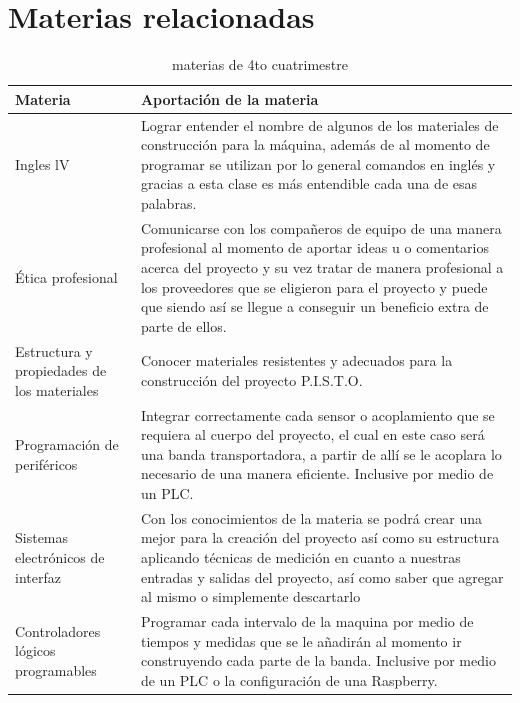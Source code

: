 \documentclass[12pt,a4paper]{article}
\begin{document}
\section{Materias relacionadas}
\begin{table}[H]
\centering
\begin{tabular}{|m{4cm}|m{11cm}|}

\hline
Materia & Aportación de la materia \\
\hline
Ingles lV &  Lograr entender el nombre de algunos de los materiales de construcción para la máquina, además de al momento de programar se utilizan por lo general comandos en inglés y gracias a esta clase es más entendible cada una de esas palabras.\\
\hline
Ética profesional & Comunicarse con los compañeros de equipo de una manera profesional al momento de aportar ideas u o comentarios acerca del proyecto y su vez tratar de manera profesional a los proveedores que se eligieron para el proyecto y puede que siendo así se llegue a conseguir un beneficio extra de parte de ellos.\\
\hline
Estructura y propiedades de los materiales & Conocer materiales resistentes y adecuados para la construcción del proyecto P.I.S.T.O. \\
\hline
Programación de periféricos & Integrar correctamente cada sensor o acoplamiento que se requiera al cuerpo del proyecto, el cual en este caso será una banda transportadora, a partir de allí se le acoplara lo necesario de una manera eficiente. Inclusive por medio de un PLC. \\
\hline
Sistemas electrónicos de interfaz & Con los conocimientos de la materia se podrá crear una mejor para la creación del proyecto así como su estructura aplicando técnicas de medición en cuanto a nuestras entradas y salidas del proyecto, así como saber que agregar al mismo o simplemente descartarlo\\
\hline
Controladores lógicos programables & Programar cada intervalo de la maquina por medio de tiempos y medidas que se le añadirán al momento ir construyendo cada parte de la banda. Inclusive por medio de un PLC o la configuración de una Raspberry.\\
\hline

\end{tabular}
\caption{materias de 4to cuatrimestre}
\label{lineas}
\end{table}
\end{document}

